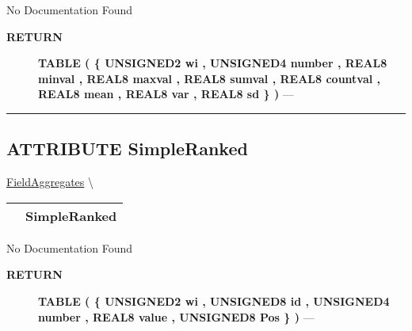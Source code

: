 \par





No Documentation Found








\par
\begin{description}
\item [\colorbox{tagtype}{\color{white} \textbf{\textsf{RETURN}}}] \textbf{TABLE ( \{ UNSIGNED2 wi , UNSIGNED4 number , REAL8 minval , REAL8 maxval , REAL8 sumval , REAL8 countval , REAL8 mean , REAL8 var , REAL8 sd \} )} --- 
\end{description}




\rule{\linewidth}{0.5pt}
\subsection*{\textsf{\colorbox{headtoc}{\color{white} ATTRIBUTE}
SimpleRanked}}

\hypertarget{ecldoc:ml_core.fieldaggregates.simpleranked}{}
\hspace{0pt} \hyperlink{ecldoc:ml_core.fieldaggregates}{FieldAggregates} \textbackslash 

{\renewcommand{\arraystretch}{1.5}
\begin{tabularx}{\textwidth}{|>{\raggedright\arraybackslash}l|X|}
\hline
\hspace{0pt}\mytexttt{\color{red} } & \textbf{SimpleRanked} \\
\hline
\end{tabularx}
}

\par





No Documentation Found








\par
\begin{description}
\item [\colorbox{tagtype}{\color{white} \textbf{\textsf{RETURN}}}] \textbf{TABLE ( \{ UNSIGNED2 wi , UNSIGNED8 id , UNSIGNED4 number , REAL8 value , UNSIGNED8 Pos \} )} --- 
\end{description}




